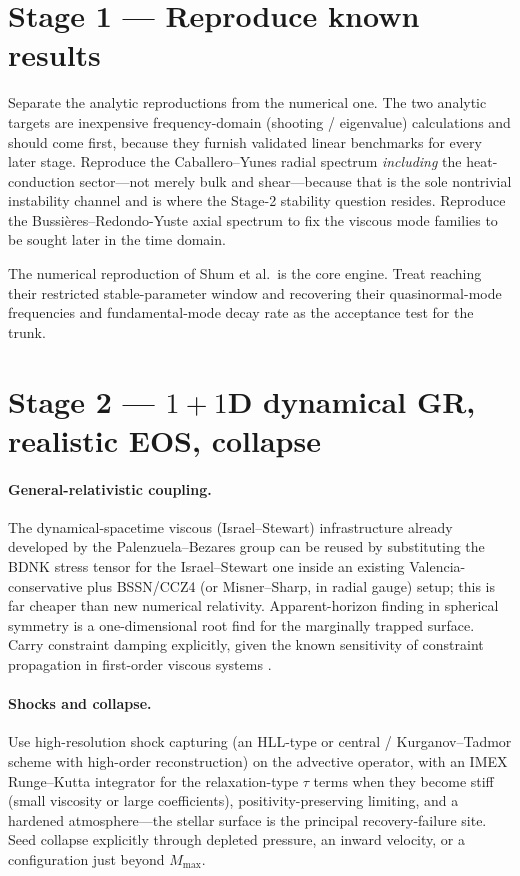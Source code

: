 \documentclass[11pt]{article}
\begin{document}
\section{Stage 1 --- Reproduce known results}
Separate the analytic reproductions from the numerical one. The two analytic
targets are inexpensive frequency-domain (shooting / eigenvalue) calculations and
should come first, because they furnish validated linear benchmarks for every
later stage. Reproduce the Caballero--Yunes radial spectrum \emph{including} the
heat-conduction sector---not merely bulk and shear---because that is the sole
nontrivial instability channel and is where the Stage-2 stability question
resides. Reproduce the Bussi\`eres--Redondo-Yuste axial spectrum to fix the
viscous mode families to be sought later in the time domain.

The numerical reproduction of Shum et al.\ is the core engine. Treat reaching
their restricted stable-parameter window and recovering their quasinormal-mode
frequencies and fundamental-mode decay rate as the acceptance test for the trunk.

\section{Stage 2 --- $1{+}1$D dynamical GR, realistic EOS, collapse}

\paragraph{General-relativistic coupling.}
The dynamical-spacetime viscous (Israel--Stewart)
infrastructure already developed by the Palenzuela--Bezares group can be reused by
substituting the BDNK stress tensor for the Israel--Stewart one inside an existing
Valencia-conservative plus BSSN/CCZ4 (or Misner--Sharp, in radial gauge) setup;
this is far cheaper than new numerical relativity. Apparent-horizon finding in
spherical symmetry is a one-dimensional root find for the marginally trapped
surface. Carry constraint damping explicitly, given the known sensitivity of
constraint propagation in first-order viscous systems \cite{FantiniRubio2025}.

\paragraph{Shocks and collapse.}
Use high-resolution shock capturing (an HLL-type or central / Kurganov--Tadmor
scheme with high-order reconstruction) on the advective operator, with an IMEX
Runge--Kutta integrator for the relaxation-type $\tau$ terms when they become stiff
(small viscosity or large coefficients), positivity-preserving limiting, and a
hardened atmosphere---the stellar surface is the principal recovery-failure site.
Seed collapse explicitly through depleted pressure, an inward velocity, or a
configuration just beyond $M_{\max}$.
\end{document}
